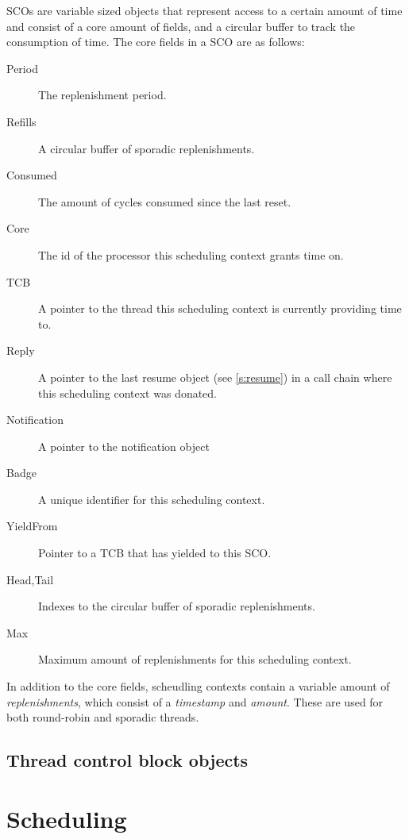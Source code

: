 \glspl{SCO} are variable sized objects that represent access to a certain amount of time and
consist of a core amount of fields, and a circular buffer to track the consumption of time.
The core fields in a \gls{SCO} are as follows:


\begin{description}
    \item[Period] The replenishment period.
    \item[Refills] A circular buffer of sporadic replenishments.
    \item[Consumed] The amount of cycles consumed since the last reset.
    \item[Core] The id of the processor this scheduling context grants time on.
    \item[TCB] A pointer to the thread this scheduling context is currently providing time to.
    \item[Reply] A pointer to the last resume object (see \cref{s:resume}) in a call chain where
        this scheduling context was donated.
    \item[Notification] A pointer to the notification object
    \item[Badge] A unique identifier for this scheduling context.
    \item[YieldFrom] Pointer to a \gls{TCB} that has yielded to this \gls{SCO}.
    \item[Head,Tail] Indexes to the circular buffer of sporadic replenishments.
    \item[Max] Maximum amount of replenishments for this scheduling context.
\end{description}

In addition to the core fields, scheudling contexts contain a variable amount of
\emph{replenishments}, which consist of a \emph{timestamp} and \emph{amount}. These are used for
both round-robin and sporadic threads.


\subsection{Thread control block objects}


\section{Scheduling}

